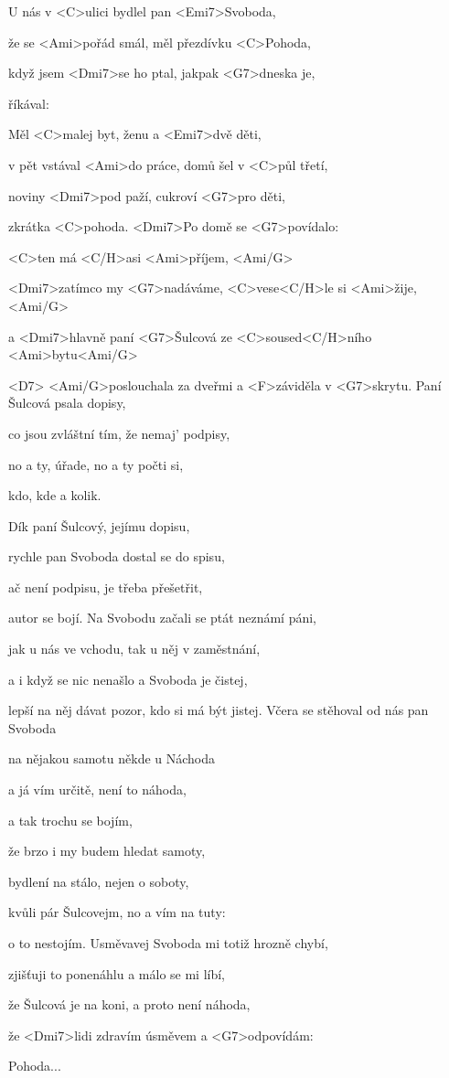 

\zs
U nás v <C>ulici bydlel pan <Emi7>Svoboda, 

že se <Ami>pořád smál, měl přezdívku <C>Pohoda, 

když jsem <Dmi7>se ho ptal, jakpak <G7>dneska je, 

říkával:  

Měl <C>malej byt, ženu a <Emi7>dvě děti,

v pět vstával <Ami>do práce, domů šel v <C>půl třetí, 

noviny <Dmi7>pod paží, cukroví <G7>pro děti, 

zkrátka <C>pohoda. 
\ks
\zr
<Dmi7>Po domě se <G7>povídalo: 

<C>ten má <C/H>asi <Ami>příjem, <Ami/G> 

<Dmi7>zatímco my <G7>nadáváme, <C>vese<C/H>le si <Ami>žije, <Ami/G>

a <Dmi7>hlavně paní <G7>Šulcová ze <C>soused<C/H>ního <Ami>bytu<Ami/G>

<D7> <Ami/G>poslouchala za dveřmi a <F>záviděla v <G7>skrytu. 
\kr
\zs
Paní Šulcová psala dopisy, 

co jsou zvláštní tím, že nemaj' podpisy, 

no a ty, úřade, no a ty počti si, 

kdo, kde a kolik.

Dík paní Šulcový, jejímu dopisu,

rychle pan Svoboda dostal se do spisu, 

ač není podpisu, je třeba přešetřit, 

autor se bojí. 
\ks
\zr
Na Svobodu začali se ptát neznámí páni, 

jak u nás ve vchodu, tak u něj v zaměstnání, 

a i když se nic nenašlo a Svoboda je čistej, 

lepší na něj dávat pozor, kdo si má být jistej. 
\kr
\zs
Včera se stěhoval od nás pan Svoboda 

na nějakou samotu někde u Náchoda 

a já vím určitě, není to náhoda, 

a tak trochu se bojím, 

že brzo i my budem hledat samoty, 

bydlení na stálo, nejen o soboty, 

kvůli pár Šulcovejm, no a vím na tuty: 

o to nestojím. 
\ks
\zr
Usměvavej Svoboda mi totiž hrozně chybí, 

zjišťuji to ponenáhlu a málo se mi líbí, 

že Šulcová je na koni, a proto není náhoda, 

že <Dmi7>lidi zdravím úsměvem a <G7>odpovídám: 

Pohoda...
\kr
\kp

